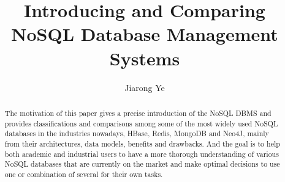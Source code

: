 \documentclass[sigconf]{acmart}
\begin{document}
\title{Introducing and Comparing NoSQL Database Management Systems}


\author{Jiarong Ye}




\begin{abstract}
	 The motivation of this paper gives a precise introduction of the
	NoSQL DBMS and provides classifications and comparisons among some of the most widely used NoSQL databases
	in the industries nowadays, HBase, Redis, MongoDB and Neo4J, mainly from their architectures, data models, benefits and drawbacks. And the goal is to help both academic and industrial users to have a more thorough understanding of various NoSQL databases that are currently on the market and make optimal decisions to use one or combination of several for their own tasks.
	
\end{abstract}




%






\maketitle





\end{document}

